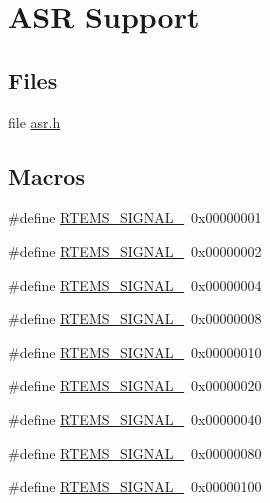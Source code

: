 \hypertarget{group__ClassicASR}{}\section{A\+SR Support}
\label{group__ClassicASR}
\subsection*{Files}
\begin{DoxyCompactItemize}
\item 
file \mbox{\hyperlink{asr_8h}{asr.\+h}}
\end{DoxyCompactItemize}
\subsection*{Macros}
\begin{DoxyCompactItemize}
\item 
\#define \mbox{\hyperlink{group__ClassicASR_gad28f0548e73227af9ed3c25e3c5d3284}{R\+T\+E\+M\+S\+\_\+\+S\+I\+G\+N\+A\+L\+\_}}~0x00000001
\item 
\#define \mbox{\hyperlink{group__ClassicASR_ga2a8b0e51f88afe662b0193ae25787a03}{R\+T\+E\+M\+S\+\_\+\+S\+I\+G\+N\+A\+L\+\_}}~0x00000002
\item 
\#define \mbox{\hyperlink{group__ClassicASR_ga0b46502e8c231be8e3761647f70686f2}{R\+T\+E\+M\+S\+\_\+\+S\+I\+G\+N\+A\+L\+\_}}~0x00000004
\item 
\#define \mbox{\hyperlink{group__ClassicASR_ga0ec2e7b9be7e0f883aa1824e7cd63abd}{R\+T\+E\+M\+S\+\_\+\+S\+I\+G\+N\+A\+L\+\_}}~0x00000008
\item 
\#define \mbox{\hyperlink{group__ClassicASR_ga7291ccc46f4b387a3c9af729fe766a05}{R\+T\+E\+M\+S\+\_\+\+S\+I\+G\+N\+A\+L\+\_}}~0x00000010
\item 
\#define \mbox{\hyperlink{group__ClassicASR_gae01ec2c019115ce6d7987676d555f8e2}{R\+T\+E\+M\+S\+\_\+\+S\+I\+G\+N\+A\+L\+\_}}~0x00000020
\item 
\#define \mbox{\hyperlink{group__ClassicASR_gaaf963213de935915c9310cfdae6f01cf}{R\+T\+E\+M\+S\+\_\+\+S\+I\+G\+N\+A\+L\+\_}}~0x00000040
\item 
\#define \mbox{\hyperlink{group__ClassicASR_ga1140efbcca58fe12b5041a1f20ddaeb9}{R\+T\+E\+M\+S\+\_\+\+S\+I\+G\+N\+A\+L\+\_}}~0x00000080
\item 
\#define \mbox{\hyperlink{group__ClassicASR_gab68581bbf73c6e1b736ec70171e90a11}{R\+T\+E\+M\+S\+\_\+\+S\+I\+G\+N\+A\+L\+\_}}~0x00000100
\item 

\end{DoxyCompactItemize}

